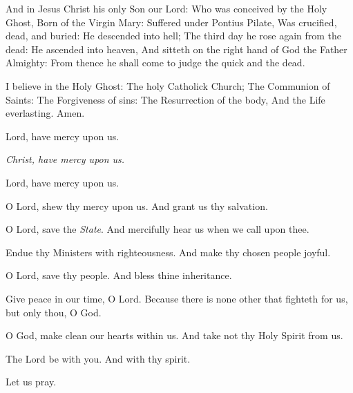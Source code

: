 And in Jesus Christ his only Son our Lord: Who was conceived by the Holy Ghost, Born of the Virgin Mary: Suffered under Pontius Pilate, Was crucified, dead, and buried: He descended into hell; The third day he rose again from the dead: He ascended into heaven, And sitteth on the right hand of God the Father Almighty: From thence he shall come to judge the quick and the dead.

I believe in the Holy Ghost: The holy Catholick Church; The Communion of Saints: The Forgiveness of sins: The Resurrection of the body, And the Life everlasting. Amen.


\bigskip
{}

\centerline{Lord, have mercy upon us.}
\centerline{\emph{Christ, have mercy upon us.}}
\centerline{Lord, have mercy upon us.}

\medskip
{\centering\footnotesize{}\par}
\ourFather

\smallskip

\centerline{}

\V O Lord, shew thy mercy upon us.  \R And grant us thy salvation.

\V O Lord, save the \emph{State}.  \R And mercifully hear us when we call upon thee.

\V Endue thy Ministers with righteousness.  \R And make thy chosen people joyful.

\V  O Lord, save thy people.  \R And bless thine inheritance.

\V Give peace in our time, O Lord.  \R Because there is none other that fighteth for us, but only thou, O God.

\V O God, make clean our hearts within us.  \R And take not thy Holy Spirit from us.

\V The Lord be with you.  \R And with thy spirit.

\centerline{Let us pray.}



\subsection{}

